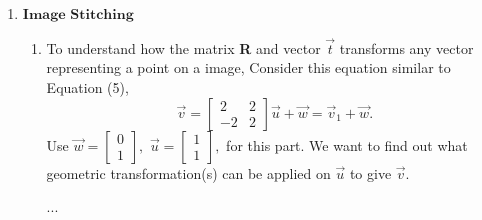 \documentclass[11pt]{article}
\begin{document}
\begin{enumerate}
\begin{enumerate}
         
   \end{enumerate}
   \newpage
   \item $\textbf{Image Stitching}$
       \begin{enumerate}
           \item To understand how the matrix \textbf{R} and vector $\vec t$ transforms any vector representing a point on a image,
            Consider this equation similar to Equation (5),
                \[
                	\vec v = \begin{bmatrix}
                    		    2 & 2 \\
                			   -2 & 2
                	\end{bmatrix} \vec u + \vec w 
                    = \vec v_1 + \vec w.
                \]
                Use $\vec w = \begin{bmatrix}
                				0 \\
                				1
                            \end{bmatrix},
                    $
                    $\vec u = \begin{bmatrix}
                				1 \\
                				1
                            \end{bmatrix},$
                            for this part.
                We want to find out what geometric transformation(s) can be applied on $\vec u$ to give $\vec v$.
                \begin{Answer}
                    ...
                \end{Answer}
                

\end{enumerate}
\end{enumerate}
\end{document}
